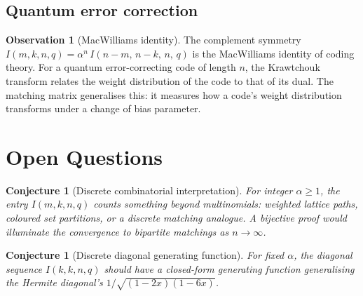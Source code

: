 \documentclass[11pt,a4paper]{article}
\theoremstyle{plain}
\newtheorem{conjecture}[theorem]{Conjecture}
\theoremstyle{definition}
\newtheorem{observation}[theorem]{Observation}
\begin{document}
\subsection{Quantum error correction}

\begin{tcolorbox}[colback=black!5, colframe=black!5, boxrule=0pt,
  sharp corners]
\begin{observation}[MacWilliams identity]\label{obs:mac}
The complement symmetry
$I(m,k,n,q) = \alpha^n\, I(n{-}m,\, n{-}k,\, n,\, q)$
is the MacWilliams identity of coding theory. For a quantum
error-correcting code of length $n$, the Krawtchouk transform
relates the weight distribution of the code to that of its dual.
The matching matrix generalises this: it measures how a code's
weight distribution transforms under a change of bias parameter.
\end{observation}
\end{tcolorbox}

\section{Open Questions}

\begin{tcolorbox}[colback=blue!5, colframe=blue!5, boxrule=0pt,
  sharp corners]
\begin{conjecture}[Discrete combinatorial interpretation]
\label{conj:discrete-comb}
For integer $\alpha \ge 1$, the entry $I(m,k,n,q)$ counts something
beyond multinomials: weighted lattice paths, coloured set partitions,
or a discrete matching analogue. A bijective proof would illuminate
the convergence to bipartite matchings as $n \to \infty$.
\end{conjecture}
\end{tcolorbox}

\begin{tcolorbox}[colback=blue!5, colframe=blue!5, boxrule=0pt,
  sharp corners]
\begin{conjecture}[Discrete diagonal generating function]
\label{conj:discrete-diag}
For fixed $\alpha$, the diagonal sequence $I(k,k,n,q)$ should have a
closed-form generating function generalising the Hermite diagonal's
$1/\sqrt{(1{-}2x)(1{-}6x)}$.
\end{conjecture}
\end{tcolorbox}
\end{document}
